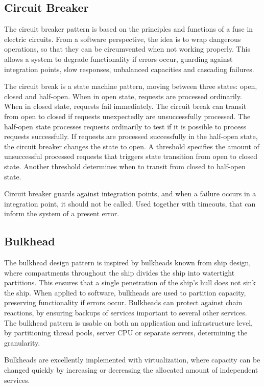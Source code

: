 \subsection{Circuit Breaker}
The circuit breaker pattern is based on the principles and functions of a fuse in electric circuits. From a software perspective, the idea is to wrap dangerous operations, so that they can be circumvented when not working properly. This allows a system to degrade functionality if errors occur, guarding against integration points, slow responses, unbalanced capacities and cascading failures.

The circuit break is a state machine pattern, moving between three states: open, closed and half-open. When in open state, requests are processed ordinarily. When in closed state, requests fail immediately. The circuit break can transit from open to closed if requests unexpectedly are unsuccessfully processed. The half-open state processes requests ordinarily to test if it is possible to process requests successfully. If requests are processed successfully in the half-open state, the circuit breaker changes the state to open. A threshold specifies the amount of unsuccessful processed requests that triggers state transition from open to closed state. Another threshold determines when to transit from closed to half-open state.

Circuit breaker guards against integration points, and when a failure occurs in a integration point, it should not be called. Used together with timeouts, that can inform the system of a present error.

\subsection{Bulkhead}
The bulkhead design pattern is inspired by bulkheads known from ship design, where compartments throughout the ship divides the ship into watertight partitions. This ensures that a single penetration of the ship's hull does not sink the ship. When applied to software, bulkheads are used to partition capacity, preserving functionality if errors occur. Bulkheads can protect against chain reactions, by ensuring backups of services important to several other services. The bulkhead pattern is usable on both an application and infrastructure level, by partitioning thread pools, server CPU or separate servers, determining the granularity. 


Bulkheads are excellently implemented with virtualization, where capacity can be changed quickly by increasing or decreasing the allocated amount of independent services.

